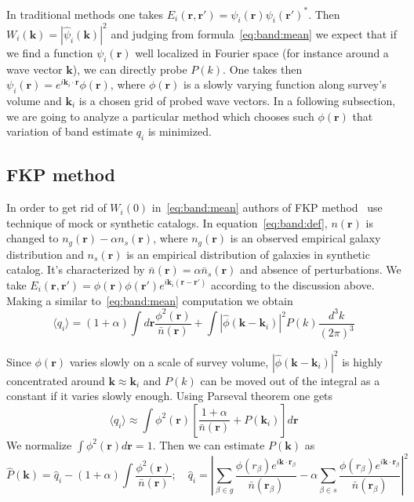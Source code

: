 \documentclass[12pt]{extarticle}
\numberwithin{problem}{section}
\numberwithin{theorem}{section}
\begin{document}
	In traditional methods one takes $E_i(\mathbf{r}, \mathbf{r}') = \psi_i(\mathbf{r})\psi_i(\mathbf{r}')^*$. Then $W_i(\mathbf{k}) = |\hat{\psi}_i(\mathbf{k})|^2$ and judging from formula~\ref{eq:band:mean} we expect that if we find a function $\psi_i(\mathbf{r})$ well localized in Fourier space (for instance around a wave vector $\mathbf{k}$), we can directly probe $P(k)$. One takes then $\psi_i(\mathbf{r}) = e^{i\mathbf{k}_i\cdot\mathbf{r}}\phi(\mathbf{r})$, where $\phi(\mathbf{r})$ is a slowly varying function along survey's volume and $\mathbf{k}_i$ is a chosen grid of probed wave vectors. In a following subsection, we are going to analyze a particular method which chooses such $\phi(\mathbf{r})$ that variation of band estimate $q_i$ is minimized.
	
	\subsection{FKP method}
	In order to get rid of $W_i(0)$ in~\ref{eq:band:mean} authors of FKP method~\cite{feldman:1994} use technique of mock or synthetic catalogs. In equation~\ref{eq:band:def}, $n(\mathbf{r})$ is changed to $n_g(\mathbf{r}) - \alpha n_s(\mathbf{r})$, where $n_g(\mathbf{r})$ is an observed empirical galaxy distribution and $n_s(\mathbf{r})$ is an empirical distribution of galaxies in synthetic catalog. It's characterized by $\bar{n}(\mathbf{r}) = \alpha \bar{n}_s(\mathbf{r})$ and absence of perturbations. We take $E_i(\mathbf{r}, \mathbf{r}') = \phi(\mathbf{r})\phi(\mathbf{r}')e^{i\mathbf{k}_i(\mathbf{r} - \mathbf{r}')}$ according to the discussion above. Making a similar to~\ref{eq:band:mean} computation we obtain
	\begin{equation}
		\label{eq:band:fkp}
		\langle q_i\rangle = (1 + \alpha)\int d\mathbf{r}\frac{\phi^2(\mathbf{r})}{\bar{n}(\mathbf{r})} + \int |\hat{\phi}(\mathbf{k} - \mathbf{k}_i)|^2 P(k)\frac{d^3k}{(2\pi)^3}
	\end{equation}

	Since $\phi(\mathbf{r})$ varies slowly on a scale of survey volume, $|\hat{\phi}(\mathbf{k} - \mathbf{k}_i)|^2$ is highly concentrated around $\mathbf{k}\approx\mathbf{k}_i$ and $P(k)$ can be moved out of the integral as a constant if it varies slowly enough. Using Parseval theorem one gets
	\begin{equation}
		\langle q_i\rangle\approx\int \phi^2(\mathbf{r})\left[\frac{1 + \alpha}{\bar{n}(\mathbf{r})} + P(\mathbf{k}_i)\right] d\mathbf{r}
	\end{equation}
	We normalize $\int \phi^2(\mathbf{r}) d\mathbf{r} = 1$. Then we can estimate $P(\mathbf{k})$ as
	\begin{equation}
		\label{eq:spectrum:estimate}
		\hat{P}(\mathbf{k}) = \hat{q}_i - (1 + \alpha)\int \frac{\phi^2(\mathbf{r})}{\bar{n}(\mathbf{r})};\quad \hat{q}_i = \left|\sum_{\beta\in g} \frac{\phi(r_\beta)e^{i\mathbf{k}\cdot\mathbf{r}_\beta}}{\bar{n}(\mathbf{r}_\beta)} - \alpha\sum_{\beta\in s} \frac{\phi(r_\beta)e^{i\mathbf{k}\cdot\mathbf{r}_\beta}}{\bar{n}(\mathbf{r}_\beta)}\right|^2
	\end{equation}
\end{document}
